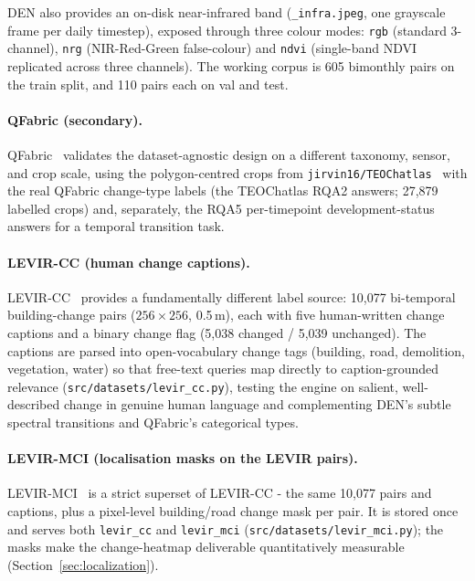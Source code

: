 \documentclass{article}
\begin{document}
DEN also provides an on-disk near-infrared band (\texttt{\_infra.jpeg}, one
grayscale frame per daily timestep), exposed through three colour modes:
\texttt{rgb} (standard 3-channel), \texttt{nrg} (NIR-Red-Green false-colour) and
\texttt{ndvi} (single-band NDVI replicated across three channels). The working
corpus is 605 bimonthly pairs on the train split, and 110 pairs each on val and
test.

\paragraph{QFabric (secondary).}
QFabric~\cite{qfabric} validates the dataset-agnostic design on a different
taxonomy, sensor, and crop scale, using the polygon-centred crops from
\texttt{jirvin16/TEOChatlas}~\cite{teochat} with the real QFabric change-type
labels (the TEOChatlas RQA2 answers; 27{,}879 labelled crops) and, separately,
the RQA5 per-timepoint development-status answers for a temporal transition task.

\paragraph{LEVIR-CC (human change captions).}
LEVIR-CC~\cite{levircc} provides a fundamentally different label source: 10{,}077
bi-temporal building-change pairs ($256\times256$, 0.5\,m), each with five
human-written change captions and a binary change flag (5{,}038 changed /
5{,}039 unchanged). The captions are parsed into open-vocabulary change tags
(building, road, demolition, vegetation, water) so that free-text queries map
directly to caption-grounded relevance (\texttt{src/datasets/levir\_cc.py}),
testing the engine on salient, well-described change in genuine human language
and complementing DEN's subtle spectral transitions and QFabric's categorical
types.

\paragraph{LEVIR-MCI (localisation masks on the LEVIR pairs).}
LEVIR-MCI~\cite{levirmci} is a strict superset of LEVIR-CC - the same 10{,}077
pairs and captions, plus a pixel-level building/road change mask per pair. It is
stored once and serves both \texttt{levir\_cc} and \texttt{levir\_mci}
(\texttt{src/datasets/levir\_mci.py}); the masks make the change-heatmap
deliverable quantitatively measurable (Section~\ref{sec:localization}).
\end{document}
